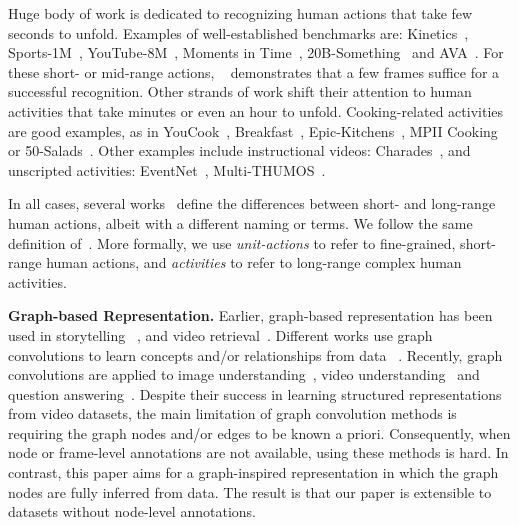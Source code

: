 \documentclass[10pt,twocolumn,letterpaper]{article}
\newcommand{\partitle}[1]{\noindent\textbf{#1}}
\newcommand{\ptspace}{\vspace*{5pt}}
\begin{document}
Huge body of work is dedicated to recognizing human actions that take few seconds to unfold. Examples of well-established benchmarks are: Kinetics~\cite{kay2017kinetics}, Sports-1M~\cite{karpathy2014large}, YouTube-8M~\cite{abu2016youtube}, Moments in Time~\cite{monfort2018moments}, 20B-Something~\cite{goyal2017something} and AVA~\cite{gu2017ava}.
For these short- or mid-range actions, ~\cite{sigurdsson2017actions} demonstrates that a few frames suffice for a successful recognition.
Other strands of work shift their attention to human activities that take minutes or even an hour to unfold.
Cooking-related activities are good examples, as in YouCook~\cite{zhou2018towards}, Breakfast~\cite{kuehne2014language}, Epic-Kitchens~\cite{damen2018scaling}, MPII Cooking~\cite{rohrbach2016recognizing} or 50-Salads~\cite{stein2013combining}.
Other examples include instructional videos: Charades~\cite{sigurdsson2016hollywood}, and unscripted activities: EventNet~\cite{ye2015eventnet}, Multi-THUMOS~\cite{yeung2018every}.

In all cases, several works~\cite{kuehne2014language, hussein2018timeception, rohrbach2016recognizing, gaidon2011actom} define the differences between short- and long-range human actions, albeit with a different naming or terms.
We follow the same definition of~\cite{kuehne2014language}.
More formally, we use \textit{unit-actions} to refer to fine-grained, short-range human actions, and \textit{activities} to refer to long-range complex human activities.

\ptspace
\partitle{Graph-based Representation.}
Earlier, graph-based representation has been used in storytelling ~\cite{kim2014reconstructing,xiong2015storyline}, and video retrieval~\cite{pan2001videograph}.
Different works use graph convolutions to learn concepts and/or relationships from data ~\cite{niepert2016learning, defferrard2016convolutional,kipf2016semi}.
Recently, graph convolutions are applied to image understanding~\cite{yunpeng2018Graph}, video understanding~\cite{wang2018videos, Huang2018finding, girdhar2018video, huang2018neural} and question answering~\cite{wang2018make}.
Despite their success in learning structured representations from video datasets, the main limitation of graph convolution methods is requiring the graph nodes and/or edges to be known a priori.
Consequently, when node or frame-level annotations are not available, using these methods is hard.
In contrast, this paper aims for a graph-inspired representation in which the graph nodes are fully inferred from data.
The result is that our paper is extensible to datasets without node-level annotations.
\end{document}

